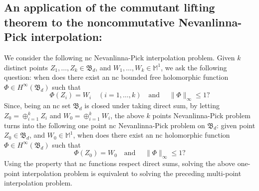 \documentclass[12pt]{amsart}%
\numberwithin{equation}{section}
\newcommand{\fB}{{\mathfrak{B}}}
\begin{document}
\subsection{An application of the commutant lifting theorem to the noncommutative Nevanlinna-Pick interpolation:} We consider the following nc Nevanlinna-Pick interpolation problem.
Given $k$ distinct points $Z_1, \ldots, Z_k\in \fB_d$, and $W_1,\ldots, W_k\in \mathbb{M}^1$, we ask the following question: when does there exist an nc bounded free holomorphic function $\Phi\in H^\infty(\fB_d)$ such that 
\[\Phi(Z_i)=W_i \quad (i=1,\ldots, k) \quad \text{and }\quad \|\Phi\|_\infty\leq 1?\]
Since, being an nc set $\fB_d$ is closed under taking direct sum, by letting $Z_0=\oplus_{i=1}^k Z_i$ and $W_0=\oplus_{i=1}^k W_i$, the above $k$ points Nevanlinna-Pick problem turns into the following one point nc Nevanlinna-Pick problem on $\fB_d$: given point $Z_0\in \fB_d$, and $W_0\in \mathbb{M}^1$, when does there exist an nc holomorphic function $\Phi\in H^\infty(\fB_d)$ such that 
\[\Phi(Z_0)=W_0 \quad \text{and }\quad \|\Phi\|_\infty\leq 1?\]
Using the property that nc functions respect direct sums, solving the above one-point interpolation problem is equivalent to solving the preceding multi-point interpolation problem.
\end{document}
